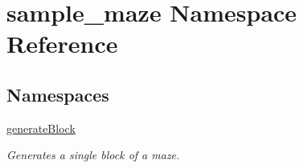 \hypertarget{namespacesample__maze}{\section{sample\-\_\-maze Namespace Reference}
\label{namespacesample__maze}
}
\subsection*{Namespaces}
\begin{DoxyCompactItemize}
\item 
\hyperlink{namespacesample__maze_1_1generate_block}{generate\-Block}
\begin{DoxyCompactList}\small\item\em Generates a single block of a maze. \end{DoxyCompactList}\end{DoxyCompactItemize}

